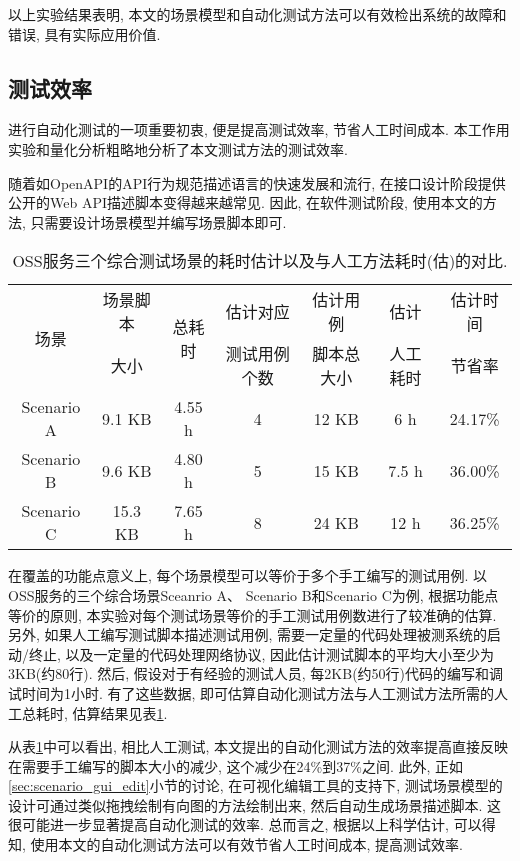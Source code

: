             以上实验结果表明, 本文的场景模型和自动化测试方法可以有效检出系统的故障和错误, 具有实际应用价值.
    
        \subsection{测试效率}
    
            进行自动化测试的一项重要初衷, 便是提高测试效率, 节省人工时间成本. 本工作用实验和量化分析粗略地分析了本文测试方法的测试效率.
            
            随着如OpenAPI的API行为规范描述语言的快速发展和流行, 在接口设计阶段提供公开的Web API描述脚本变得越来越常见. 因此, 在软件测试阶段, 使用本文的方法, 只需要设计场景模型并编写场景脚本即可.
            
            \begin{table}[!htb]
                \centering
                \small
                \begin{tabular}{ccc|ccc|c}
                    \toprule
                    \multirow{2}{*}{场景} & 场景脚本 & \multirow{2}{*}{总耗时} & 估计对应     & 估计用例   & 估计     & 估计时间  \\
                                          & 大小     &                         & 测试用例个数 & 脚本总大小 & 人工耗时 & 节省率 \\
                    \midrule
                    Scenario A & 9.1 KB & 4.55 h & 4 & 12 KB & 6 h & 24.17\% \\
                    Scenario B & 9.6 KB & 4.80 h & 5 & 15 KB & 7.5 h & 36.00\% \\
                    Scenario C & 15.3 KB & 7.65 h & 8 & 24 KB & 12 h & 36.25\% \\
                    \bottomrule
                \end{tabular}
                \caption{OSS服务三个综合测试场景的耗时估计以及与人工方法耗时(估)的对比.}
                \label{tab:efficiency_esti}
            \end{table}
            
            在覆盖的功能点意义上, 每个场景模型可以等价于多个手工编写的测试用例. 以OSS服务的三个综合场景Sceanrio A、 Scenario B和Scenario C为例, 根据功能点等价的原则, 本实验对每个测试场景等价的手工测试用例数进行了较准确的估算. 另外, 如果人工编写测试脚本描述测试用例, 需要一定量的代码处理被测系统的启动/终止, 以及一定量的代码处理网络协议, 因此估计测试脚本的平均大小至少为3KB(约80行). 然后, 假设对于有经验的测试人员, 每2KB(约50行)代码的编写和调试时间为1小时. 有了这些数据, 即可估算自动化测试方法与人工测试方法所需的人工总耗时, 估算结果见表\ref{tab:efficiency_esti}.
            
            从表\ref{tab:efficiency_esti}中可以看出, 相比人工测试, 本文提出的自动化测试方法的效率提高直接反映在需要手工编写的脚本大小的减少, 这个减少在24\%到37\%之间. 此外, 正如\ref{sec:scenario_gui_edit}小节的讨论, 在可视化编辑工具的支持下, 测试场景模型的设计可通过类似拖拽绘制有向图的方法绘制出来, 然后自动生成场景描述脚本. 这很可能进一步显著提高自动化测试的效率. 总而言之, 根据以上科学估计, 可以得知, 使用本文的自动化测试方法可以有效节省人工时间成本, 提高测试效率.
